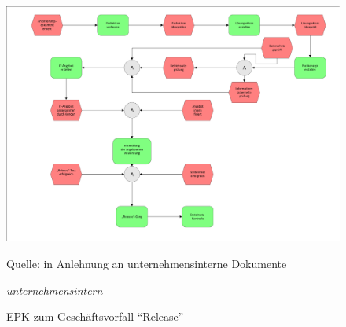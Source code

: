 \begin{figure}[h!]
	\centering
	\includegraphics[scale=0.51]{img/prozessRelease.pdf}
	\caption{\acs{EPK} zum Geschäftsvorfall \enquote{Release}}
	\label{abb:meilensteineRelease}
	{\footnotesize Quelle: in Anlehnung an unternehmensinterne Dokumente}
	{\footnotesize \par \textit{unternehmensintern}}
\end{figure}

